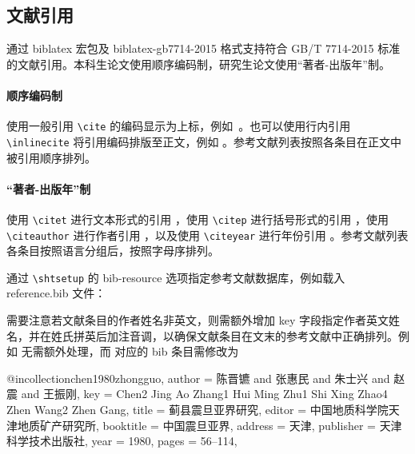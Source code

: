 \documentclass[master]{shtthesis}
\begin{document}
\subsection{文献引用} \label{sec::citation}
\shtthesis{} 通过 \textsf{biblatex} 宏包及 \textsf{biblatex-gb7714-2015} 格式支持符合 GB/T 7714-2015 标准的文献引用。本科生论文使用顺序编码制，研究生论文使用“著者-出版年”制。

\paragraph{顺序编码制}
使用一般引用 \verb|\cite| 的编码显示为上标，例如~\cite{stamerjohanns2009mathml, yuan2012lana}。也可以使用行内引用 \verb|\inlinecite| 将引用编码排版至正文，例如 。参考文献列表按照各条目在正文中被引用顺序排列。

\paragraph{“著者-出版年”制}
使用 \verb|\citet| 进行文本形式的引用 \citet{Bohan1928}，使用 \verb|\citep| 进行括号形式的引用 \citep{yuan2012lana}，使用 \verb|\citeauthor| 进行作者引用 \citeauthor{niu2013zonghe}，以及使用 \verb|\citeyear| 进行年份引用 \citeyear{walls2013drought}。参考文献列表各条目按照语言分组后，按照字母序排列。

\shtthesis{} 通过 \verb|\shtsetup| 的 bib-resource 选项指定参考文献数据库，例如载入 reference.bib 文件：

需要注意若文献条目的作者姓名非英文，则需额外增加 key 字段指定作者英文姓名，并在姓氏拼英后加注音调，以确保文献条目在文末的参考文献中正确排列。例如 \citet{bravo1990comparative} 无需额外处理，而 \citet{chen1980zhongguo} 对应的 bib 条目需修改为
\begin{latex}
@incollection{chen1980zhongguo,
  author    = {陈晋镳 and 张惠民 and 朱士兴 and 赵震 and 王振刚},
  key       = {Chen2 Jing Ao Zhang1 Hui Ming Zhu1 Shi Xing Zhao4 Zhen Wang2 Zhen Gang},
  title     = {蓟县震旦亚界研究},
  editor    = {中国地质科学院天津地质矿产研究所},
  booktitle = {中国震旦亚界},
  address   = {天津},
  publisher = {天津科学技术出版社},
  year      = {1980},
  pages     = {56--114},
}
\end{latex}
\end{document}
